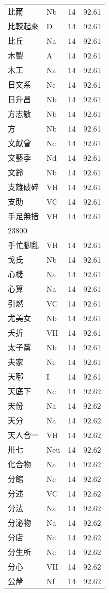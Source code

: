 \documentclass[twocolumn]{book}
\begin{document}
\begin{supertabular}{llrr}
比爾 & Nb & 14 &  92.61\\
比較起來 & D & 14 &  92.61\\
比丘 & Na & 14 &  92.61\\
木製 & A & 14 &  92.61\\
木工 & Na & 14 &  92.61\\
日文系 & Nc & 14 &  92.61\\
日升昌 & Nb & 14 &  92.61\\
方志敏 & Nb & 14 &  92.61\\
方 & Nb & 14 &  92.61\\
文獻會 & Nc & 14 &  92.61\\
文藝季 & Nd & 14 &  92.61\\
文鈴 & Nb & 14 &  92.61\\
支離破碎 & VH & 14 &  92.61\\
支助 & VC & 14 &  92.61\\
手足無措 & VH & 14 &  92.61\\
23800\\
手忙腳亂 & VH & 14 &  92.61\\
戈氏 & Nb & 14 &  92.61\\
心機 & Na & 14 &  92.61\\
心算 & Na & 14 &  92.61\\
引燃 & VC & 14 &  92.61\\
尤美女 & Nb & 14 &  92.61\\
夭折 & VH & 14 &  92.61\\
太子黨 & Nb & 14 &  92.61\\
夫家 & Nc & 14 &  92.61\\
天哪 & I & 14 &  92.61\\
天底下 & Nc & 14 &  92.62\\
天份 & Na & 14 &  92.62\\
天分 & Na & 14 &  92.62\\
天人合一 & VH & 14 &  92.62\\
卅七 & Neu & 14 &  92.62\\
化合物 & Na & 14 &  92.62\\
分館 & Nc & 14 &  92.62\\
分述 & VC & 14 &  92.62\\
分法 & Na & 14 &  92.62\\
分泌物 & Na & 14 &  92.62\\
分店 & Nc & 14 &  92.62\\
分生所 & Nc & 14 &  92.62\\
分心 & VH & 14 &  92.62\\
公釐 & Nf & 14 &  92.62\\

\end{supertabular}
\end{document}
